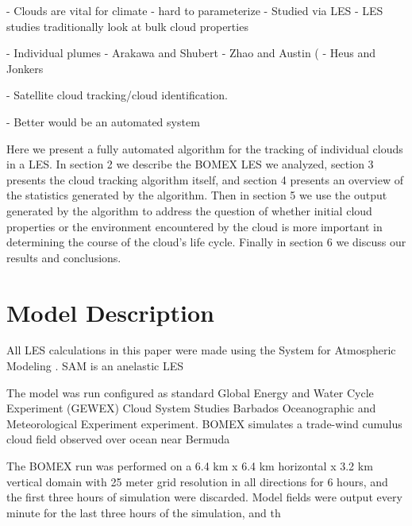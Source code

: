 \documentclass[acp]{copernicus}
\begin{document}



\introduction

- Clouds are vital for climate
- hard to parameterize
- Studied via LES
- LES studies traditionally look at bulk cloud properties

- Individual plumes
- Arakawa and Shubert
- Zhao and Austin (
- Heus and Jonkers

- Satellite cloud tracking/cloud identification.

- Better would be an automated system

Here we present a fully automated algorithm for the tracking of individual 
clouds in a LES.  In section 2 we describe the BOMEX LES we analyzed, section 
3 presents the cloud tracking algorithm itself, and section 4 presents an 
overview of the statistics generated by the algorithm.  Then in section 5 we 
use the output generated by the algorithm to address the question of whether 
initial cloud properties or the environment encountered by the cloud is more 
important in determining the course of the cloud's life cycle.  Finally in 
section 6 we discuss our results and conclusions.


\section{Model Description}

All LES calculations in this paper were made using the System for Atmospheric 
Modeling \citep[SAM;][]{Khairoutdinov2003}.  SAM is an anelastic LES 

The model was run configured as standard Global Energy and Water
Cycle Experiment (GEWEX) Cloud System Studies \citep[GCSS;][]{Randall2003}
Barbados Oceanographic and Meteorological Experiment 
\citep[BOMEX;][]{Siebesma2003} experiment.  BOMEX simulates a trade-wind 
cumulus cloud field observed over ocean near Bermuda

The BOMEX run was performed on a 6.4 km x 6.4 km horizontal x 3.2 km vertical 
domain with 25 meter grid resolution in all directions for 6 hours, and the 
first three hours of simulation were discarded.  Model fields were output 
every minute for the last three hours of the simulation, and th

\end{document}
